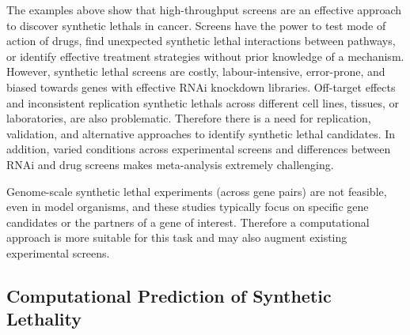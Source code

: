 The examples above show that high-throughput screens are an effective approach to discover \glspl{synthetic lethal} in cancer. %
Screens have the power to test mode of action of drugs, find unexpected \gls{synthetic lethal} interactions between \glspl{pathway}, or identify effective treatment strategies without prior knowledge of a mechanism. However, \gls{synthetic lethal} screens are costly, labour-intensive, error-prone, and biased towards genes with effective \gls{RNAi} knockdown libraries. 
Off-target effects and inconsistent replication \glspl{synthetic lethal} across different cell lines, tissues, or laboratories, are also problematic. 
Therefore there is a need for replication, validation, and alternative approaches to identify \gls{synthetic lethal} candidates. In addition, varied conditions across experimental screens and differences between \gls{RNAi} and drug screens makes meta-analysis extremely challenging.

Genome-scale \gls{synthetic lethal} experiments (across gene pairs) are not feasible, even in model organisms, and these studies typically focus on specific gene candidates or the partners of a gene of interest. %
Therefore a computational approach is more suitable for this task and may also augment existing experimental screens. %

\subsection[Computational Prediction of Synthetic Lethality]{Computational Prediction of Synthetic Lethality}

